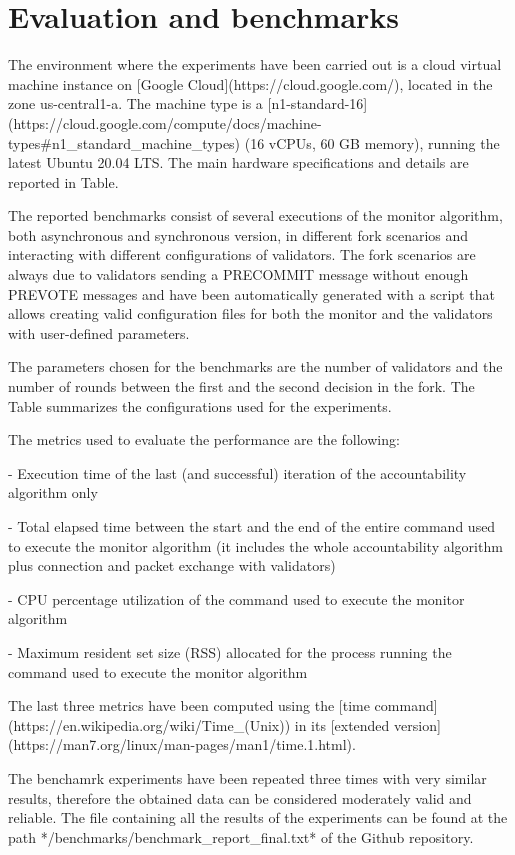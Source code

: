 \documentclass[a4paper,11pt,oneside]{report}
\begin{document}
\chapter{Evaluation and benchmarks}

\begin{markdown}

The environment where the experiments have been carried out is a cloud virtual machine instance on [Google Cloud](https://cloud.google.com/), located in the zone us-central1-a. 
The machine type is a [n1-standard-16](https://cloud.google.com/compute/docs/machine-types#n1_standard_machine_types) (16 vCPUs, 60 GB memory), running the latest Ubuntu 20.04 LTS. The main hardware specifications and details are reported in Table.

The reported benchmarks consist of several executions of the monitor algorithm, both asynchronous and synchronous version, in different fork scenarios and interacting with different configurations of validators.
The fork scenarios are always due to validators sending a PRECOMMIT message without enough PREVOTE messages and have been automatically generated with a script that allows creating valid configuration files for both the monitor and the validators with user-defined parameters.

The parameters chosen for the benchmarks are the number of validators and the number of rounds between the first and the second decision in the fork. 
The Table summarizes the configurations used for the experiments.

The metrics used to evaluate the performance are the following:

- Execution time of the last (and successful) iteration of the accountability algorithm only

- Total elapsed time between the start and the end of the entire command used to execute the monitor algorithm (it includes the whole accountability algorithm plus connection and packet exchange with validators)

- CPU percentage utilization of the command used to execute the monitor algorithm

- Maximum resident set size (RSS) allocated for the process running the command used to execute the monitor algorithm~\cite{wiki:rss}

The last three metrics have been computed using the [time command](https://en.wikipedia.org/wiki/Time_(Unix)) in its [extended version](https://man7.org/linux/man-pages/man1/time.1.html).

The benchamrk experiments have been repeated three times with very similar results, therefore the obtained data can be considered moderately valid and reliable.
The file containing all the results of the experiments can be found at the path */benchmarks/benchmark_report_final.txt* of the Github repository. 

\end{markdown}
\end{document}
